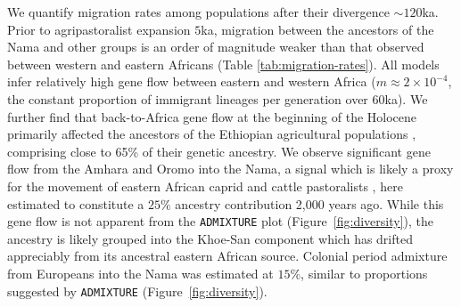 \documentclass[]{article}
\begin{document}
We quantify migration rates among populations after their divergence
$\sim120$ka. Prior to agripastoralist expansion $5$ka, migration between the
ancestors of the Nama and other groups is an order of magnitude weaker than
that observed between western and eastern Africans (Table
\ref{tab:migration-rates}). All models infer relatively high gene flow between
eastern and western Africa ($m\approx2\times10^{-4}$, the constant proportion
of immigrant lineages per generation over $60$ka). We further find that
back-to-Africa gene flow at the beginning of the Holocene primarily affected
the ancestors of the Ethiopian agricultural populations
\citep{Molinaro2019-rf}, comprising close to 65\% of their genetic ancestry. We
observe significant gene flow from the Amhara and Oromo into the Nama, a signal
which is likely a proxy for the movement of eastern African caprid and cattle
pastoralists \citep{Henn2008-xo,Breton2014-xb}, here estimated to constitute a
$25\%$ ancestry contribution 2,000 years ago. While this gene flow is not
apparent from the \texttt{ADMIXTURE} plot (Figure~\ref{fig:diversity}), the
ancestry is likely grouped into the Khoe-San component which has drifted
appreciably from its ancestral eastern African source. Colonial period
admixture from Europeans into the Nama was estimated at $15\%$, similar to
proportions suggested by \texttt{ADMIXTURE} (Figure~\ref{fig:diversity}).
\end{document}
